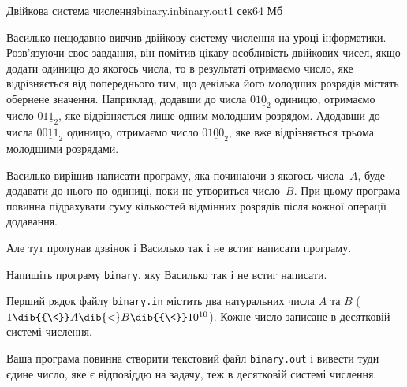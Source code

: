 \begin{problem}{Двійкова система числення}{binary.in}{binary.out}{1 сек}{64 Мб}

Василько нещодавно вивчив двійкову систему числення на уроці інформатики. Розв'язуючи
своє завдання, він помітив цікаву особливість двійкових чисел, якщо додати одиницю до
якогось числа, то в результаті отримаємо число, яке відрізняється від попереднього тим, що
декілька його молодших розрядів містять обернене значення. Наприклад, додавши до числа
$01\underline{0}_2$ одиницю, отримаємо число $01\underline{1}_2$, яке відрізняється лише одним молодшим розрядом. А\nolinebreak[3]
додавши до числа $0\underline{011}_2$ одиницю, отримаємо число $0\underline{100}_2$, яке вже відрізняється трьома
молодшими розрядами.

Василько вирішив написати програму, яка починаючи з якогось числа~$A$, буде додавати до
нього по одиниці, поки не утвориться число~$B$. При цьому програма повинна підрахувати
суму кількостей відмінних розрядів після кожної операції додавання.

Але тут пролунав дзвінок і Василько так і не встиг написати програму.

\Task 
Напишіть програму \texttt{binary}, яку Василько так і не встиг написати.

\InputFile
Перший рядок файлу \texttt{binary.in} містить два натуральних числа $A$ та $B$ ($1\dib{{\<}}A\dib{{<}}B\dib{{\<}}10^{10}$). Кожне число записане в десятковій системі числення.

\OutputFile
Ваша програма повинна створити текстовий файл \texttt{binary.out} і вивести туди
єдине число, яке є відповіддю на задачу, теж в десятковій системі числення.

\Example
\begin{exampleWidthsAndDefaultFileNames}{2em}{2em}%
%
\end{exampleWidthsAndDefaultFileNames}

\end{problem}

